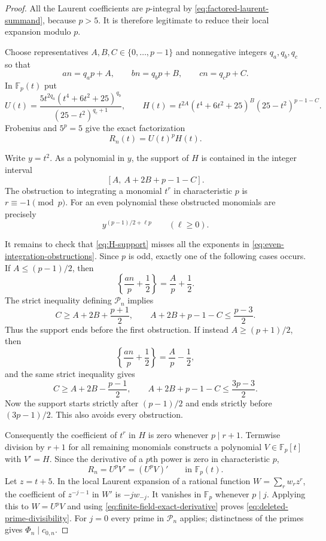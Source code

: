 \documentclass[11pt,reqno,letterpaper]{amsart}
\numberwithin{equation}{section}
\theoremstyle{definition}
\theoremstyle{remark}
\begin{document}
\begin{proof}
All the Laurent coefficients are $p$-integral by
\eqref{eq:factored-laurent-summand}, because $p>5$.  It is therefore
legitimate to reduce their local expansion modulo $p$.

Choose representatives $A,B,C\in\{0,\ldots,p-1\}$ and nonnegative
integers $q_a,q_b,q_c$ so that
\[
 an=q_ap+A,\qquad bn=q_bp+B,\qquad cn=q_cp+C.
\]
In $\mathbb F_p(t)$ put
\begin{equation}\label{eq:finite-field-U-H}
 U(t)=\frac{5t^{2q_a}(t^4+6t^2+25)^{q_b}}
 {(25-t^2)^{q_c+1}},
 \qquad
 H(t)=t^{2A}(t^4+6t^2+25)^B(25-t^2)^{p-1-C}.
\end{equation}
Frobenius and $5^p=5$ give the exact factorization
\begin{equation}\label{eq:frobenius-factorization}
 R_n(t)=U(t)^pH(t).
\end{equation}

Write $y=t^2$.  As a polynomial in $y$, the support of $H$ is contained
in the integer interval
\begin{equation}\label{eq:H-support}
 [A,\ A+2B+p-1-C].
\end{equation}
The obstruction to integrating a monomial $t^r$ in characteristic $p$
is $r\equiv-1\pmod p$.  For an even polynomial these obstructed
monomials are precisely
\begin{equation}\label{eq:even-integration-obstructions}
 y^{(p-1)/2+\ell p}\qquad(\ell\geq0).
\end{equation}

It remains to check that \eqref{eq:H-support} misses all the exponents in
\eqref{eq:even-integration-obstructions}.  Since $p$ is odd, exactly one
of the following cases occurs.  If $A\leq(p-1)/2$, then
\[
 \left\{\frac{an}{p}+\frac12\right\}=\frac Ap+\frac12.
\]
The strict inequality defining $\mathcal P_n$ implies
\[
 C\geq A+2B+\frac{p+1}{2},
 \qquad
 A+2B+p-1-C\leq\frac{p-3}{2}.
\]
Thus the support ends before the first obstruction.  If instead
$A\geq(p+1)/2$, then
\[
 \left\{\frac{an}{p}+\frac12\right\}=\frac Ap-\frac12,
\]
and the same strict inequality gives
\[
 C\geq A+2B-\frac{p-1}{2},
 \qquad
 A+2B+p-1-C\leq\frac{3p-3}{2}.
\]
Now the support starts strictly after $(p-1)/2$ and ends strictly before
$(3p-1)/2$.  This also avoids every obstruction.

Consequently the coefficient of $t^r$ in $H$ is zero whenever
$p\mid r+1$.  Termwise division by $r+1$ for all remaining monomials
constructs a polynomial $V\in\mathbb F_p[t]$ with $V'=H$.  Since the
derivative of a $p$th power is zero in characteristic $p$,
\begin{equation}\label{eq:finite-field-exact-derivative}
 R_n=U^pV'=(U^pV)'
 \qquad\text{in }\mathbb F_p(t).
\end{equation}
Let $z=t+5$.  In the local Laurent expansion of a rational function
$W=\sum_r w_rz^r$, the coefficient of $z^{-j-1}$ in $W'$ is
$-j w_{-j}$.  It vanishes in $\mathbb F_p$ whenever $p\mid j$.
Applying this to $W=U^pV$ and using
\eqref{eq:finite-field-exact-derivative} proves
\eqref{eq:deleted-prime-divisibility}.  For $j=0$ every prime in
$\mathcal P_n$ applies; distinctness of the primes gives
$\Phi_n\mid c_{0,n}$.
\end{proof}
\end{document}
